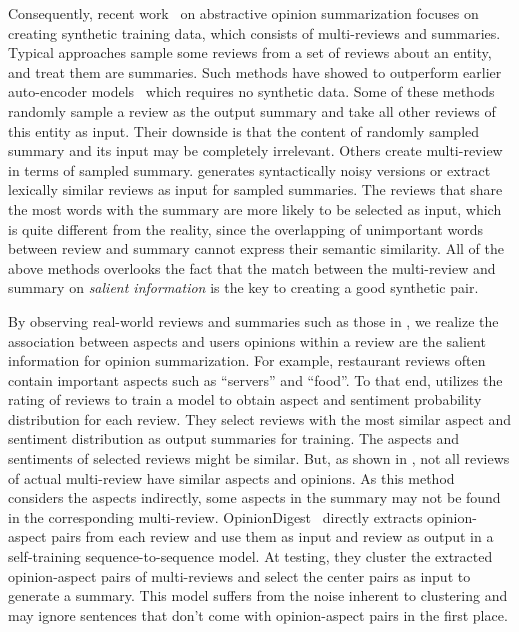 Consequently, recent work~\cite{Copycat20, Denoise20, 
Fewshot20, Plansum20} 
on abstractive opinion summarization focuses on 
creating synthetic training data, which consists of 
multi-reviews and summaries.
Typical approaches sample some reviews from a set of reviews
about an entity,  and treat them are summaries.
Such methods have showed to outperform
earlier auto-encoder models~\cite{MeanSum19} which requires no
synthetic data. 
Some of these methods~\cite{Copycat20,Fewshot20} randomly sample
a review as the output summary and take all other reviews of this 
entity as input.
Their downside is that the content of randomly sampled summary 
and its input may be completely irrelevant.  
Others create multi-review in terms of sampled summary. 
\citet{Denoise20} generates syntactically noisy versions or 
extract lexically similar reviews as input for sampled summaries. 
The reviews that share the most words with the summary are 
more likely to be selected as input, which is quite different 
from the reality, 
since the overlapping of unimportant words between review 
and summary cannot express their semantic similarity.
All of the above methods overlooks the fact
that the match between the multi-review and summary on 
\textit{salient information} is the key to creating 
a good synthetic pair.

By observing real-world reviews and summaries such as those in
, we realize the association between aspects and 
users opinions within a review are the salient information for 
opinion summarization. 
For example, restaurant reviews often contain important aspects
such as ``servers'' and ``food''. To that end, 
\citet{Plansum20} utilizes the rating of reviews 
to train a model to obtain aspect and sentiment probability distribution
for each review. 
They select reviews with the most similar aspect and 
sentiment distribution as output summaries for training.
The aspects and sentiments of selected reviews might be similar.
But, as shown in ,
not all reviews of actual multi-review have similar aspects and opinions.
As this method considers the aspects indirectly,
some aspects in the summary may not be found in the corresponding 
multi-review.
OpinionDigest~\cite{OpiDig20} directly 
extracts opinion-aspect pairs from each review
and use them as input and review as output
in a self-training sequence-to-sequence model.
At testing, they cluster the extracted opinion-aspect pairs 
of multi-reviews and select the center pairs as input to 
generate a summary. This model suffers from the noise 
inherent to clustering and may ignore sentences that don't
come with opinion-aspect pairs in the first place.

